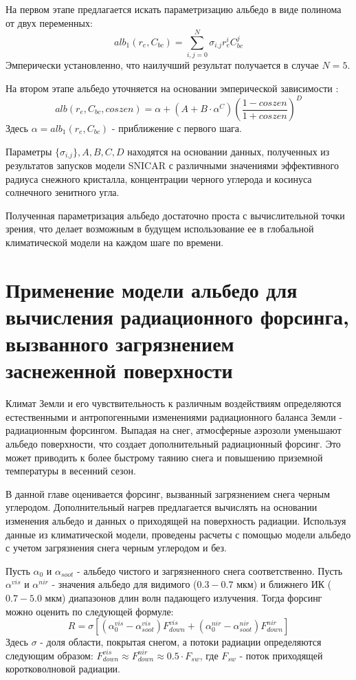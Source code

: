 \documentclass[a4paper, fontsize=14pt]{scrartcl}
\begin{document}
На первом этапе предлагается искать параметризацию альбедо в виде полинома от двух переменных:
\begin{equation}
    alb_1(r_e, C_{bc}) = \sum_{i,j = 0}^N \sigma_{i.j} r_e^i C_{bc}^j   \label{sys}  
\end{equation}
Эмперически установленно, что наилучший результат получается в случае $N = 5$.

На втором этапе альбедо уточняется на основании эмперической зависимости \cite{Saito2019}:
\begin{equation}
    alb(r_e, C_{bc}, coszen) = \alpha + (A + B \cdot \alpha^C) \left( \dfrac{1 - coszen}{1 + coszen} \right)^D     \label{sys}  
\end{equation}
Здесь $\alpha = alb_1(r_e, C_{bc})$ - приближение с первого шага.

Параметры $\{ \sigma_{i.j} \}, A, B, C, D$ находятся на основании данных, полученных из результатов запусков модели SNICAR с различными значениями эффективного радиуса снежного кристалла, концентрации черного углерода и косинуса солнечного зенитного угла.

Полученная параметризация альбедо достаточно проста с вычислительной точки зрения, что делает возможным в будущем использование ее в глобальной климатической модели на каждом шаге по времени.


\newpage
\section{Применение модели альбедо для вычисления радиационного форсинга, вызванного загрязнением заснеженной поверхности}

Климат Земли и его чувствительность к различным воздействиям определяются естественными и антропогенными изменениями радиационного баланса Земли - радиационным форсингом. Выпадая на снег, атмосферные аэрозоли уменьшают альбедо поверхности, что создает дополнительный радиационный форсинг. Это может приводить к более быстрому таянию снега и повышению приземной температуры в весенний сезон. 

В данной главе оценивается форсинг, вызванный загрязнением снега черным углеродом. Дополнительный нагрев предлагается вычислять на основании изменения альбедо и данных о приходящей на поверхность радиации. Используя данные из климатической модели, проведены расчеты с помощью модели альбедо с учетом загрязнения снега черным углеродом и без.

Пусть $\alpha_{0}$ и $\alpha_{soot}$ - альбедо чистого и загрязненного снега соответственно. Пусть $\alpha^{vis}$ и $\alpha^{nir}$ - значения альбедо для видимого ($0.3-0.7$ мкм) и ближнего ИК ($0.7-5.0$ мкм) диапазонов длин волн падающего излучения. Тогда форсинг можно оценить по следующей формуле:
\begin{equation}
    R = \sigma [ (\alpha_{0}^{vis} - \alpha_{soot}^{vis})F_{down}^{vis} + (\alpha_{0}^{nir} - \alpha_{soot}^{nir})F_{down}^{nir} ] \label{sysFORC}  
\end{equation}
Здесь $\sigma$ - доля области, покрытая снегом, а потоки радиации определяются следующим образом: $F_{down}^{vis} \approx F_{down}^{nir} \approx 0.5 \cdot F_{sw}$, где $F_{sw}$ - поток приходящей коротковолновой радиации.
\end{document}
